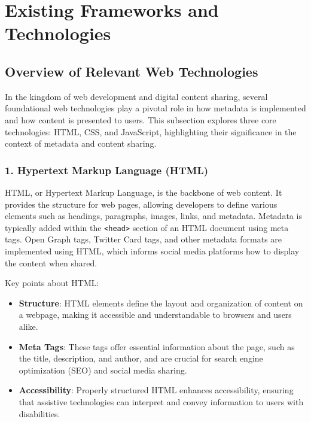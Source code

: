 \section{Existing Frameworks and Technologies}
\label{sec:existing_frameworks_and_technologies}

\subsection{Overview of Relevant Web Technologies}
\label{subsec:overview_of_relevant_web_technologies}

In the kingdom of web development and digital content sharing, several foundational web technologies play a pivotal role in how metadata is implemented and how content is presented to users. This subsection explores three core technologies: HTML, CSS, and JavaScript, highlighting their significance in the context of metadata and content sharing.

\subsubsection{1. Hypertext Markup Language (HTML)}

HTML, or Hypertext Markup Language, is the backbone of web content. It provides the structure for web pages, allowing developers to define various elements such as headings, paragraphs, images, links, and metadata. Metadata is typically added within the \texttt{<head>} section of an HTML document using meta tags. Open Graph tags, Twitter Card tags, and other metadata formats are implemented using HTML, which informs social media platforms how to display the content when shared.

Key points about HTML:
\begin{itemize}
    \item \textbf{Structure}: HTML elements define the layout and organization of content on a webpage, making it accessible and understandable to browsers and users alike.
    \item \textbf{Meta Tags}: These tags offer essential information about the page, such as the title, description, and author, and are crucial for search engine optimization (SEO) and social media sharing.
    \item \textbf{Accessibility}: Properly structured HTML enhances accessibility, ensuring that assistive technologies can interpret and convey information to users with disabilities.
\end{itemize}

